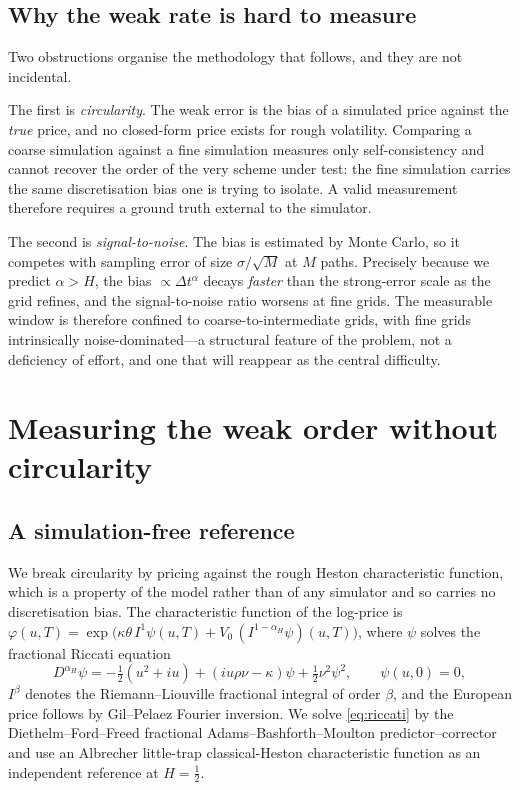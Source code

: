 \documentclass[11pt]{article}
\theoremstyle{plain}
\theoremstyle{definition}
\begin{document}
\subsection{Why the weak rate is hard to measure}

Two obstructions organise the methodology that follows, and they are not incidental.

The first is \emph{circularity}. The weak error is the bias of a simulated price against
the \emph{true} price, and no closed-form price exists for rough volatility. Comparing a
coarse simulation against a fine simulation measures only self-consistency and cannot
recover the order of the very scheme under test: the fine simulation carries the same
discretisation bias one is trying to isolate. A valid measurement therefore requires a
ground truth external to the simulator.

The second is \emph{signal-to-noise}. The bias is estimated by Monte Carlo, so it
competes with sampling error of size $\sigma/\sqrt{M}$ at $M$ paths. Precisely because
we predict $\alpha>H$, the bias $\propto \Delta t^{\alpha}$ decays \emph{faster} than the
strong-error scale as the grid refines, and the signal-to-noise ratio worsens at fine
grids. The measurable window is therefore confined to coarse-to-intermediate grids,
with fine grids intrinsically noise-dominated---a structural feature of the problem, not
a deficiency of effort, and one that will reappear as the central difficulty.

\section{Measuring the weak order without circularity}\label{sec:method}

\subsection{A simulation-free reference}

We break circularity by pricing against the rough Heston characteristic function, which
is a property of the model rather than of any simulator and so carries no discretisation
bias. The characteristic function of the log-price is
$\varphi(u,T)=\exp\big(\kappa\theta\,I^1\psi(u,T) + V_0\,(I^{1-\alpha_{\!H}}\psi)(u,T)\big)$,
where $\psi$ solves the fractional Riccati equation
\begin{equation}
D^{\alpha_{\!H}}\psi
 = -\tfrac12(u^2+iu) + (iu\rho\nu - \kappa)\psi + \tfrac12\nu^2\psi^2,
\qquad \psi(u,0)=0, \label{eq:riccati}
\end{equation}
$I^{\beta}$ denotes the Riemann--Liouville fractional integral of order $\beta$, and the
European price follows by Gil--Pelaez Fourier inversion. We solve \eqref{eq:riccati}
by the Diethelm--Ford--Freed fractional Adams--Bashforth--Moulton predictor--corrector
and use an Albrecher little-trap classical-Heston characteristic function as an
independent reference at $H=\tfrac12$.
\end{document}
